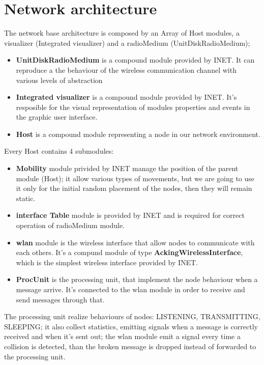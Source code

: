 \section{Network architecture}
The network base architecture is composed by an Array of Host modules, a visualizer (Integrated visualizer) and a radioMedium (UnitDiskRadioMedium);
\begin{itemize}
    \item \textbf{UnitDiskRadioMedium} is a compound module provided by INET. It can reproduce a the behaviour of the wireless communication 
    channel with various levels of abstraction
    \item \textbf{Integrated visualizer} is a compound module provided by INET. It's resposible for the visual representation of modules properties 
    and events in the graphic user interface.
    \item \textbf{Host} is a compound module representing a node in our network environment. 
\end{itemize}
Every Host contains 4 submodules:
\begin{itemize}
    \item \textbf{Mobility} module privided by INET manage the position of the parent module (Host); it allow various types of movements,
        but we are going to use it only for the initial random placement of the nodes, then they will remain static.
    \item \textbf{interface Table} module is provided by INET and is required for correct operation of radioMedium module.
    \item \textbf{wlan} module is the wireless interface that allow nodes to communicate with each others. It's a compund module of type 
        \textbf{AckingWirelessInterface}, which is the simplest wireless interface provided by INET.
    \item \textbf{ProcUnit} is the processing unit, that implement the node behaviour when a message arrive. It's connected to
    the wlan module in order to receive and send messages through that.
\end{itemize}

The processing unit realize behaviours of nodes: LISTENING, TRANSMITTING, SLEEPING; it also collect statistics, emitting signals when 
a message is correctly received and when it's sent out; the wlan module emit a signal every time a collision is detected, than the broken
message is dropped instead of forwarded to the processing unit. 
